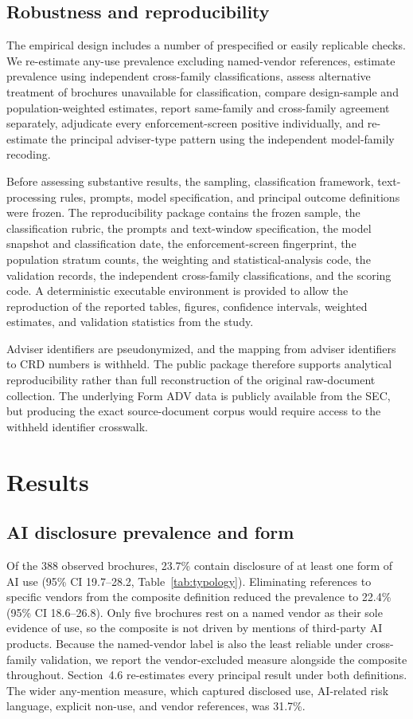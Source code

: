 \documentclass[utf8]{FrontiersinHarvard}
\begin{document}
\subsection{Robustness and reproducibility}

The empirical design includes a number of prespecified or easily replicable checks. We re-estimate any-use prevalence excluding named-vendor references, estimate prevalence using independent cross-family classifications, assess alternative treatment of brochures unavailable for classification, compare design-sample and population-weighted estimates, report same-family and cross-family agreement separately, adjudicate every enforcement-screen positive individually, and re-estimate the principal adviser-type pattern using the independent model-family recoding.

Before assessing substantive results, the sampling, classification framework, text-processing rules, prompts, model specification, and principal outcome definitions were frozen. The reproducibility package contains the frozen sample, the classification rubric, the prompts and text-window specification, the model snapshot and classification date, the enforcement-screen fingerprint, the population stratum counts, the weighting and statistical-analysis code, the validation records, the independent cross-family classifications, and the scoring code. A deterministic executable environment is provided to allow the reproduction of the reported tables, figures, confidence intervals, weighted estimates, and validation statistics from the study.

Adviser identifiers are pseudonymized, and the mapping from adviser identifiers to CRD numbers is withheld. The public package therefore supports analytical reproducibility rather than full reconstruction of the original raw-document collection. The underlying Form ADV data is publicly available from the SEC, but producing the exact source-document corpus would require access to the withheld identifier crosswalk.

\section{Results}

\subsection{AI disclosure prevalence and form}

Of the 388 observed brochures, 23.7\% contain disclosure of at least one form of AI use (95\% CI 19.7--28.2, Table~\ref{tab:typology}). Eliminating references to specific vendors from the composite definition reduced the prevalence to 22.4\% (95\% CI 18.6--26.8). Only five brochures rest on a named vendor as their sole evidence of use, so the composite is not driven by mentions of third-party AI products. Because the named-vendor label is also the least reliable under cross-family validation, we report the vendor-excluded measure alongside the composite throughout. Section~4.6 re-estimates every principal result under both definitions. The wider any-mention measure, which captured disclosed use, AI-related risk language, explicit non-use, and vendor references, was 31.7\%.
\end{document}
